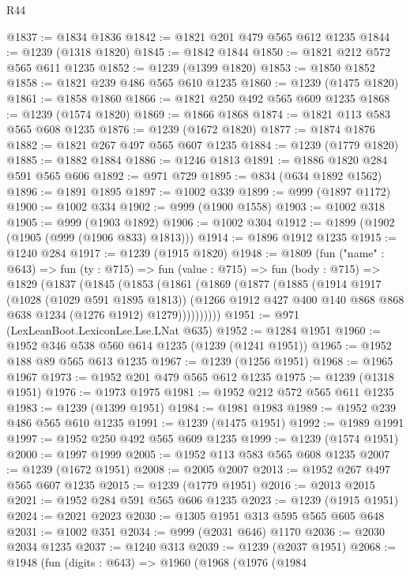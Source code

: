 \begin{lexlean}{R44}
\begin{coremodule}
@1837 := @1834 @1836
@1842 := @1821 @201 @479 @565 @612 @1235
@1844 := @1239 (@1318 @1820)
@1845 := @1842 @1844
@1850 := @1821 @212 @572 @565 @611 @1235
@1852 := @1239 (@1399 @1820)
@1853 := @1850 @1852
@1858 := @1821 @239 @486 @565 @610 @1235
@1860 := @1239 (@1475 @1820)
@1861 := @1858 @1860
@1866 := @1821 @250 @492 @565 @609 @1235
@1868 := @1239 (@1574 @1820)
@1869 := @1866 @1868
@1874 := @1821 @113 @583 @565 @608 @1235
@1876 := @1239 (@1672 @1820)
@1877 := @1874 @1876
@1882 := @1821 @267 @497 @565 @607 @1235
@1884 := @1239 (@1779 @1820)
@1885 := @1882 @1884
@1886 := @1246 @1813
@1891 := @1886 @1820 @284 @591 @565 @606
@1892 := @971 @729
@1895 := @834 (@634 @1892 @1562)
@1896 := @1891 @1895
@1897 := @1002 @339
@1899 := @999 (@1897 @1172)
@1900 := @1002 @334
@1902 := @999 (@1900 @1558)
@1903 := @1002 @318
@1905 := @999 (@1903 @1892)
@1906 := @1002 @304
@1912 := @1899 (@1902 (@1905 (@999 (@1906 @833) @1813)))
@1914 := @1896 @1912 @1235
@1915 := @1240 @284
@1917 := @1239 (@1915 @1820)
@1948 := @1809
    (fun ("name" : @643) =>
    fun (ty : @715) =>
    fun (value : @715) =>
    fun (body : @715) =>
    @1829
      (@1837
        (@1845
          (@1853
            (@1861
              (@1869
                (@1877
                  (@1885
                    (@1914
                      @1917
                      (@1028 (@1029 @591 @1895 @1813))
                      (@1266 @1912 @427 @400 @140 @868 @868 @638 @1234 (@1276 @1912) @1279))))))))))
@1951 := @971 (LexLeanBoot.LexiconLse.Lse.LNat @635)
@1952 := @1284 @1951
@1960 := @1952 @346 @538 @560 @614 @1235 (@1239 (@1241 @1951))
@1965 := @1952 @188 @89 @565 @613 @1235
@1967 := @1239 (@1256 @1951)
@1968 := @1965 @1967
@1973 := @1952 @201 @479 @565 @612 @1235
@1975 := @1239 (@1318 @1951)
@1976 := @1973 @1975
@1981 := @1952 @212 @572 @565 @611 @1235
@1983 := @1239 (@1399 @1951)
@1984 := @1981 @1983
@1989 := @1952 @239 @486 @565 @610 @1235
@1991 := @1239 (@1475 @1951)
@1992 := @1989 @1991
@1997 := @1952 @250 @492 @565 @609 @1235
@1999 := @1239 (@1574 @1951)
@2000 := @1997 @1999
@2005 := @1952 @113 @583 @565 @608 @1235
@2007 := @1239 (@1672 @1951)
@2008 := @2005 @2007
@2013 := @1952 @267 @497 @565 @607 @1235
@2015 := @1239 (@1779 @1951)
@2016 := @2013 @2015
@2021 := @1952 @284 @591 @565 @606 @1235
@2023 := @1239 (@1915 @1951)
@2024 := @2021 @2023
@2030 := @1305 @1951 @313 @595 @565 @605 @648
@2031 := @1002 @351
@2034 := @999 (@2031 @646) @1170
@2036 := @2030 @2034 @1235
@2037 := @1240 @313
@2039 := @1239 (@2037 @1951)
@2068 := @1948
    (fun (digits : @643) =>
    @1960
      (@1968
        (@1976
          (@1984

\end{coremodule}
\end{lexlean}
